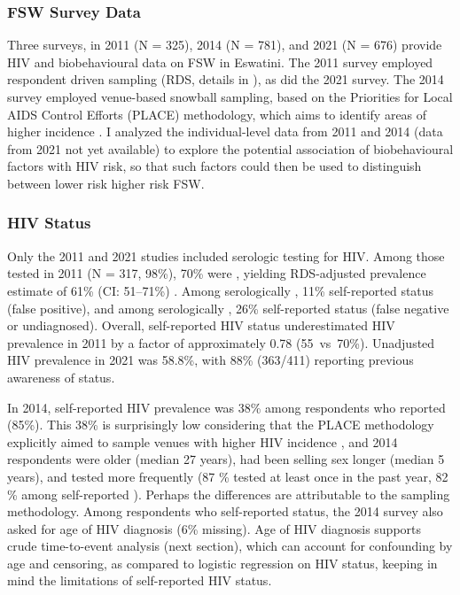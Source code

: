 \subsubsection{FSW Survey Data}\label{model.par.fsw.data}
Three surveys, in
2011 \cite{Baral2014} (N = 325),
2014 \cite{EswKP2014} (N = 781), and
2021 \cite{EswIBBS2022} (N = 676)
provide HIV and biobehavioural data on FSW in Eswatini.
The 2011 survey employed respondent driven sampling (RDS, details in \cite{Yam2013}),
as did the 2021 survey.
The 2014 survey employed venue-based snowball sampling, based on the
Priorities for Local AIDS Control Efforts (PLACE) methodology,
which aims to identify areas of higher incidence \cite{Weir2005}.
I analyzed the individual-level data from 2011 and 2014 (data from 2021 not yet available)
to explore the potential association of biobehavioural factors with HIV risk,
so that such factors could then be used to distinguish between
lower risk \vs higher risk FSW.
\subsubsection{HIV Status}\label{model.par.fsw.hiv}
Only the 2011 and 2021 studies included serologic testing for HIV.
Among those tested in 2011 (N = 317, 98\%), 70\% were \hivp,
yielding RDS-adjusted prevalence estimate of 61\% (CI: 51--71\%) \cite{Baral2014}.
Among serologically \hivn, 11\% self-reported \hivp status (false positive), and
among serologically \hivp, 26\% self-reported \hivn status (false negative or undiagnosed).
Overall, self-reported HIV status underestimated HIV prevalence in 2011
by a factor of approximately 0.78 (55~vs~70\%).
Unadjusted HIV prevalence in 2021 was 58.8\%,
with 88\% (363/411) reporting previous awareness of \hivp status.
\par
In 2014, self-reported HIV prevalence was 38\% among respondents who reported (85\%).
This 38\% is surprisingly low considering that
the PLACE methodology explicitly aimed to sample venues
with higher HIV incidence \cite{Weir2005}, and 2014  respondents
were older (median 27  years), %
had been selling sex longer (median 5  years), %
and tested more frequently (87 \% tested at least once in the past year, %
82 \% among self-reported \hivn).
Perhaps the differences are attributable to the sampling methodology.
Among respondents who self-reported \hivp status,
the 2014 survey also asked for age of HIV diagnosis (6\% missing).
Age of HIV diagnosis supports crude time-to-event analysis (next section),
which can account for confounding by age and censoring,
as compared to logistic regression on HIV status,
keeping in mind the limitations of self-reported HIV status.
